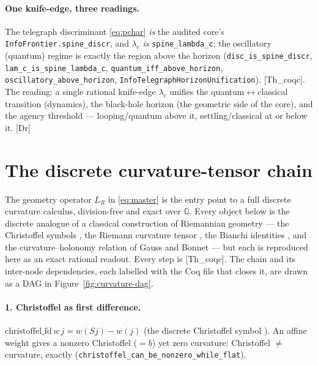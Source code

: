 \documentclass[10pt,twocolumn]{article}
\theoremstyle{definition}
\newcommand{\Thq}{\textsf{[Th\_coqc]}}
\newcommand{\Dr}{\textsf{[Dr]}}
\newcommand{\code}[1]{\texttt{#1}}
\newcommand{\LR}{L_{R}}
\begin{document}
\paragraph{One knife-edge, three readings.} The telegraph discriminant \eqref{eq:pchar}
\emph{is} the audited core's \code{InfoFrontier.spine\_discr}, and $\lambda_c$ \emph{is}
\code{spine\_lambda\_c}; the oscillatory (quantum) regime is exactly the region above the
horizon (\code{disc\_is\_spine\_discr}, \code{lam\_c\_is\_spine\_lambda\_c},
\code{quantum\_iff\_above\_horizon}, \code{oscillatory\_above\_horizon},
\code{InfoTelegraphHorizonUnification}). \Thq{}. The reading: a single rational knife-edge
$\lambda_c$ unifies the quantum$\leftrightarrow$classical transition (dynamics), the
black-hole horizon (the geometric side of the core), and the agency threshold ---
looping/quantum above it, settling/classical at or below it. \Dr{}

\section{The discrete curvature-tensor chain}\label{sec:curvature}

The geometry operator $\LR$ in \eqref{eq:master} is the entry point to a full discrete
curvature calculus, division-free and exact over $\mathbb{Q}$. Every object below is the
discrete analogue of a classical construction of Riemannian geometry --- the Christoffel
symbols \cite{christoffel1869}, the Riemann curvature tensor \cite{riemann1868}, the Bianchi
identities \cite{bianchi1902}, and the curvature--holonomy relation of Gauss and Bonnet
\cite{gauss1828,bonnet1848} --- but each is reproduced here as an exact rational readout.
Every step is \Thq{}. The chain and its inter-node dependencies, each labelled with the
Coq file that closes it, are drawn as a DAG in Figure~\ref{fig:curvature-dag}.



\paragraph{1. Christoffel as first difference.} $\mathrm{christoffel\_fd}\,w\,j = w(Sj)-w(j)$
(the discrete Christoffel symbol \cite{christoffel1869}).
An affine weight gives a nonzero Christoffel ($=b$) yet zero curvature: Christoffel $\ne$
curvature, exactly (\code{christoffel\_can\_be\_nonzero\_while\_flat}).
\end{document}

